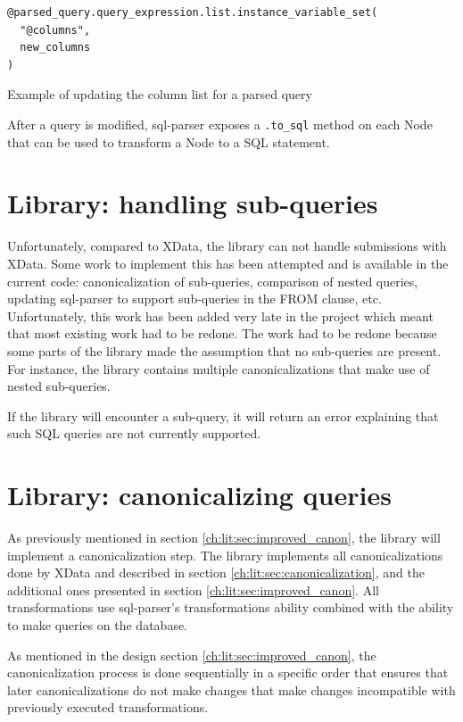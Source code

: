 \begin{listing}
\begin{verbatim}
@parsed_query.query_expression.list.instance_variable_set(
  "@columns",
  new_columns
)
\end{verbatim}
\caption{Example of updating the column list for a parsed query}
\end{listing}

After a query is modified, sql-parser exposes a \texttt{.to_sql} method on each Node that can be used to transform a Node to a SQL statement.

\section{Library: handling sub-queries}

Unfortunately, compared to XData, the library can not handle submissions with XData. Some work to implement this has been attempted and is available in the current code: canonicalization of sub-queries, comparison of nested queries, updating sql-parser to support sub-queries in the FROM clause, etc. Unfortunately, this work has been added very late in the project which meant that most existing work had to be redone. The work had to be redone because some parts of the library made the assumption that no sub-queries are present. For instance, the library contains multiple canonicalizations that make use of nested sub-queries. 

If the library will encounter a sub-query, it will return an error explaining that such SQL queries are not currently supported.

\section{Library: canonicalizing queries}

As previously mentioned in section \ref{ch:lit:sec:improved_canon}, the library will implement a canonicalization step. The library implements all canonicalizations done by XData and described in section \ref{ch:lit:sec:canonicalization}, and the additional ones presented in section \ref{ch:lit:sec:improved_canon}. All transformations use sql-parser's transformations ability combined with the ability to make queries on the database.

As mentioned in the design section \ref{ch:lit:sec:improved_canon}, the canonicalization process is done sequentially in a specific order that ensures that later canonicalizations do not make changes that make changes incompatible with previously executed transformations. 

